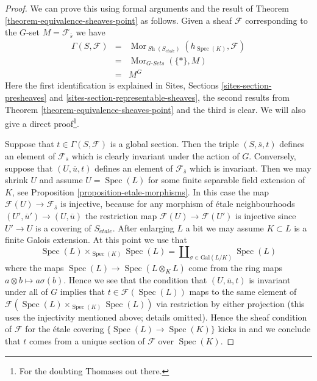 \documentclass[10pt,a4paper]{amsart}
\theoremstyle{plain}
\theoremstyle{definition}
\theoremstyle{remark}
\numberwithin{equation}{subsection}
\def\Spec{\mathop{\mathrm{Spec}}}
\def\Mor{\mathop{\mathrm{Mor}}\nolimits}
\def\Sh{\mathop{\mathit{Sh}}\nolimits}
\def\etale{{\acute{e}tale}}
\begin{document}
\begin{proof}
We can prove this using formal arguments and the result of
Theorem \ref{theorem-equivalence-sheaves-point}
as follows. Given a sheaf $\mathcal{F}$ corresponding to
the $G$-set $M = \mathcal{F}_{\overline{s}}$ we have
\begin{eqnarray*}
\Gamma(S, \mathcal{F}) & = &
\Mor_{\Sh(S_\etale)}(h_{\Spec(K)},  \mathcal{F})
\\
& = & \Mor_{G\textit{-Sets}}(\{*\}, M) \\
& = & M^G
\end{eqnarray*}
Here the first identification is explained in
Sites, Sections \ref{sites-section-presheaves} and
\ref{sites-section-representable-sheaves},
the second results from
Theorem \ref{theorem-equivalence-sheaves-point}
and the third is clear. We will also give a direct proof\footnote{For
the doubting Thomases out there.}.

\medskip\noindent
Suppose that $t \in \Gamma(S, \mathcal{F})$ is a global section.
Then the triple $(S, \overline{s}, t)$ defines an element of
$\mathcal{F}_{\overline{s}}$ which is clearly invariant under the
action of $G$. Conversely, suppose that $(U, \overline{u}, t)$
defines an element of $\mathcal{F}_{\overline{s}}$ which is invariant.
Then we may shrink $U$ and assume $U = \Spec(L)$ for some
finite separable field extension of $K$, see
Proposition \ref{proposition-etale-morphisms}.
In this case the map $\mathcal{F}(U) \to \mathcal{F}_{\overline{s}}$
is injective, because for any morphism of \'etale neighbourhoods
$(U', \overline{u}') \to (U, \overline{u})$ the restriction map
$\mathcal{F}(U) \to \mathcal{F}(U')$ is injective since $U' \to U$
is a covering of $S_\etale$.
After enlarging $L$ a bit we may assume $K \subset L$ is a finite
Galois extension. At this point we use that
$$
\Spec(L) \times_{\Spec(K)} \Spec(L)
=
\coprod\nolimits_{\sigma \in \text{Gal}(L/K)} \Spec(L)
$$
where the maps $\Spec(L) \to \Spec(L \otimes_K L)$
come from the ring maps $a \otimes b \mapsto a\sigma(b)$. Hence we
see that the condition that $(U, \overline{u}, t)$ is invariant
under all of $G$ implies that $t \in \mathcal{F}(\Spec(L))$
maps to the same element of
$\mathcal{F}(\Spec(L) \times_{\Spec(K)} \Spec(L))$
via restriction by either projection (this uses the injectivity mentioned
above; details omitted). Hence the sheaf condition of $\mathcal{F}$
for the \'etale covering $\{\Spec(L) \to \Spec(K)\}$ kicks
in and we conclude that $t$ comes from a unique section of $\mathcal{F}$
over $\Spec(K)$.
\end{proof}
\end{document}
